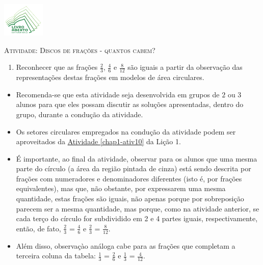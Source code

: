 \documentclass[10 pt,usenames,dvipsnames, oneside]{article}
\begin{document}
\begin{center}
  \begin{minipage}[l]{3cm}
\includegraphics[width=2cm]{../../../Figuras/logo}       
\end{minipage}\hfill
\begin{minipage}[r]{.8\textwidth}
 {\Large \scshape Atividade: Discos de frações - quantos cabem?}  
\end{minipage}
\end{center}
\vspace{.2cm}

\ifdefined\prof
\begin{goals}
\begin{enumerate}
\item       Reconhecer que as frações       $\frac{2}{3}$,
$\frac{4}{6}$       e       $\frac{8}{12}$       são iguais a partir da
observação das representações destas frações em modelos de área circulares.
\end{enumerate}

\tcblower

\begin{itemize}
\item       Recomenda-se que esta atividade seja desenvolvida em grupos de
$2$       ou       $3$       alunos para que eles possam discutir as
soluções apresentadas, dentro do grupo, durante a condução da atividade.
\item       Os setores circulares empregados na condução da atividade podem
ser aproveitados da \hyperref[chap1-ativ10]{Atividade \ref{chap1-ativ10}} da Lição 1.
\item       É importante, ao final da atividade, observar para os alunos que
uma mesma parte do círculo (a área da região pintada de cinza) está sendo
descrita por frações com numeradores e denominadores diferentes (isto é, por
frações equivalentes), mas que, não obstante, por expressarem uma mesma
quantidade, estas frações são iguais, não apenas porque por sobreposição parecem
ser a mesma quantidade, mas porque, como na atividade anterior, se cada terço do
círculo for subdividido em 2 e 4 partes iguais, respectivamente, então, de fato,
$\frac{2}{3}$       =       $\frac{4}{6}$       e       $\frac{2}{3}$
=       $\frac{8}{12}$.
\item       Além disso, observaçào análoga cabe para as frações que
completam a terceira coluna da tabela:       $\frac{1}{3}$       =
$\frac{2}{6}$       e       $\frac{1}{3}$       =       $\frac{4}{12}$.
\end{itemize}
\end{goals}
\end{document}
